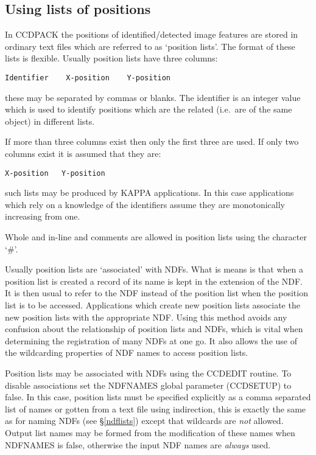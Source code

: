 \subsection{Using lists of positions}
\label{using_lists_of_positions}
In CCDPACK the positions of identified/detected image features are
stored in ordinary text files which are referred to as `position lists'.
The format of these lists is flexible. Usually position lists have three
columns:
\begin{myquote}
\begin{verbatim}
Identifier    X-position    Y-position
\end{verbatim}
\end{myquote}
these may be separated by commas or blanks. The identifier is an
integer value which is used to identify positions which are the related
(i.e.\ are of the same object) in different lists.

If more than three columns exist then only the first three are used.
If only two columns exist it is assumed that they are:
\begin{myquote}
\begin{verbatim}
X-position   Y-position
\end{verbatim}
\end{myquote}
such lists may be produced by KAPPA applications. In this case 
applications which rely on a knowledge of the identifiers  assume they
are monotonically increasing from one.

Whole and in-line and comments are allowed in position lists using the
character `\#'.

Usually position lists are `associated' with NDFs. What is means is
that when a position list is created a record of its name is kept in the
extension of the NDF. It is then usual to refer to the NDF instead of
the position list when the position list is to be accessed. Applications
which create new position lists associate the new position lists with
the appropriate NDF. Using this method avoids any confusion about the
relationship of position lists and NDFs, which is vital when determining
the registration of many NDFs at one go. It also allows the use of the
wildcarding properties of NDF names to access position lists.

Position lists may be associated with NDFs using the CCDEDIT routine. To
disable associations set the NDFNAMES global parameter (CCDSETUP) to
false. In this case, position lists must be specified explicitly as a
comma separated list of names or gotten from a text file using
indirection, this is exactly the same as for naming NDFs (see
\S\ref{ndflists}) except that wildcards are {\em not} allowed. Output
list names may be formed from the modification of these names when
NDFNAMES is false, otherwise the input NDF names are {\em always} used.

